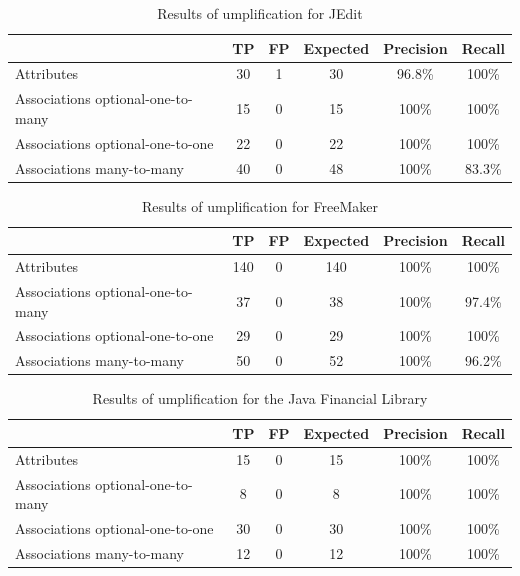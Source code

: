 \begin{table}[h]
\caption{Results of umplification for JEdit}
\label{table:umplifiedResultsSystems4}
\begin{tabularx}{\textwidth}{l|ccccc}
\toprule
\rowcolor[HTML]{BBDAFF}
\textbf{} & \textbf{TP}  & \textbf{FP}  & \textbf{Expected} & \textbf{Precision}  & \textbf{Recall}\\ \hline
Attributes & 30  & 1 & 30 & 96.8\% & 100\%\\ \hline
Associations optional-one-to-many & 15  & 0 & 15  & 100\% & 100\% \\ 
Associations optional-one-to-one  &  22 & 0 & 22 & 100\% & 100\% \\
Associations many-to-many &  40 & 0 & 48  & 100\% & 83.3\% \\ 
\end{tabularx}
\end{table}

\begin{table}[h]
\caption{Results of umplification for FreeMaker}
\label{table:umplifiedResultsSystems5}
\begin{tabularx}{\textwidth}{l|ccccc}
\toprule
\rowcolor[HTML]{BBDAFF}
\textbf{} & \textbf{TP}  & \textbf{FP} & \textbf{Expected}  & \textbf{Precision}  & \textbf{Recall}\\ \hline
Attributes & 140  & 0  & 140  & 100\% & 100\% \\ \hline
Associations optional-one-to-many &  37 & 0 & 38 & 100\% & 97.4\% \\
Associations optional-one-to-one &  29 & 0 & 29  & 100\% & 100\% \\ 
Associations many-to-many & 50 & 0 & 52 & 100\% & 96.2\%\\ 
\end{tabularx}
\end{table}

\begin{table}[h]
\caption{Results of umplification for the Java Financial Library}
\label{table:umplifiedResultsSystems6}
\begin{tabularx}{\textwidth}{l|ccccc}
\toprule
\rowcolor[HTML]{BBDAFF}
\textbf{} & \textbf{TP}  & \textbf{FP} & \textbf{Expected}  & \textbf{Precision}  & \textbf{Recall}\\ \hline
Attributes & 15  & 0  & 15  & 100\% & 100\%  \\ \hline
Associations optional-one-to-many &  8 & 0 & 8 & 100\% & 100\%\\
Associations optional-one-to-one &  30 & 0 & 30  & 100\% & 100\% \\ 
Associations many-to-many & 12 & 0 & 12 & 100\% & 100\% \\ 
\end{tabularx}
\end{table}

